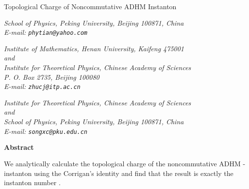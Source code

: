 \documentclass[a4paper,a4paper]{article}
\begin{document}
\thispagestyle{empty}

\begin{center}
{\Large %
Topological Charge of Noncommutative ADHM Instanton}
\end{center}

\vspace*{2cm} %

\begin{center}
 \vspace{5mm} \noindent \hspace{0.7cm}
\parbox{120mm}{\it
School of Physics, Peking University, Beijing 100871, China
\\
E-mail: {\tt phytian@yahoo.com}
 }
\end{center}

\vspace{5mm} %

\begin{center}
 \vspace{5mm} \noindent \hspace{0.7cm}
\parbox{120mm}{\it
Institute of Mathematics, Henan University, Kaifeng 475001
\\
and
\\
Institute for Theoretical Physics, Chinese Academy of Sciences
\\
P. O. Box 2735, Beijing 100080
\\
E-mail: {\tt zhucj@itp.ac.cn}
 }
\end{center}

\vspace{5mm} %

\begin{center}
 \vspace{5mm} \noindent
\hspace{0.7cm}
\parbox{120mm}{\it
Institute for Theoretical Physics, Chinese Academy of Sciences
\\
and
\\
School of Physics, Peking University, Beijing 100871, China
\\
E-mail: {\tt songxc@pku.edu.cn}
 }
\end{center}

\vspace{2cm}

\begin{center}
\textbf{Abstract}
\end{center}
We analytically calculate the topological charge of the noncommutative ADHM \coordHE{}  \coordHE{}-instanton using the Corrigan's identity and find that the result
is exactly the instanton number \coordHE{}.
\end{document}
